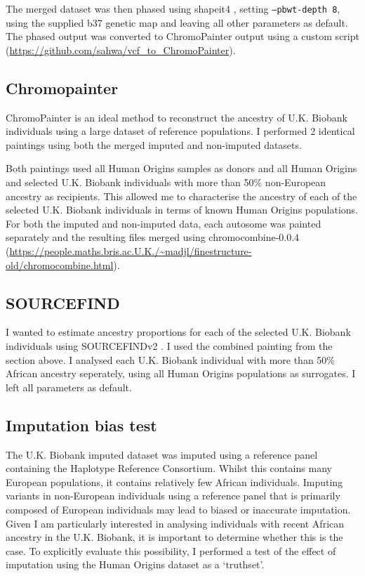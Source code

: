 The merged dataset was then phased using shapeit4 \cite{delaneau2018integrative}, setting \texttt{--pbwt-depth 8}, using the supplied b37 genetic map and leaving all other parameters as default. The phased output was converted to ChromoPainter output using a custom script (\url{https://github.com/sahwa/vcf_to_ChromoPainter}).

\subsection{Chromopainter}

ChromoPainter is an ideal method to reconstruct the ancestry of U.K. Biobank individuals using a large dataset of reference populations. I performed 2 identical paintings using both the merged imputed and non-imputed datasets.

Both paintings used all Human Origins samples as donors and all Human Origins and selected U.K. Biobank individuals with more than 50\% non-European ancestry as recipients. This allowed me to characterise the ancestry of each of the selected U.K. Biobank individuals in terms of known Human Origins populations. For both the imputed and non-imputed data, each autosome was painted separately and the resulting files merged using chromocombine-0.0.4 (\url{https://people.maths.bris.ac.U.K./~madjl/finestructure-old/chromocombine.html}).


\subsection{SOURCEFIND}

I wanted to estimate ancestry proportions for each of the selected U.K. Biobank individuals using SOURCEFINDv2 \cite{Chacon-Duque2018}. I used the combined painting from the section above. I analysed each U.K. Biobank individual with more than 50\% African ancestry seperately, using all Human Origins populations as surrogates. I left all parameters as default. 

\subsection{Imputation bias test}

The U.K. Biobank imputed dataset was imputed using a reference panel containing the Haplotype Reference Consortium. Whilst this contains many European populations, it contains relatively few African individuals. Imputing variants in non-European individuals using a reference panel that is primarily composed of European individuals may lead to biased or inaccurate imputation. Given I am particularly interested in analysing individuals with recent African ancestry in the U.K. Biobank, it is important to determine whether this is the case. To explicitly evaluate this possibility, I performed a test of the effect of imputation using the Human Origins dataset as a `truthset'.
 
